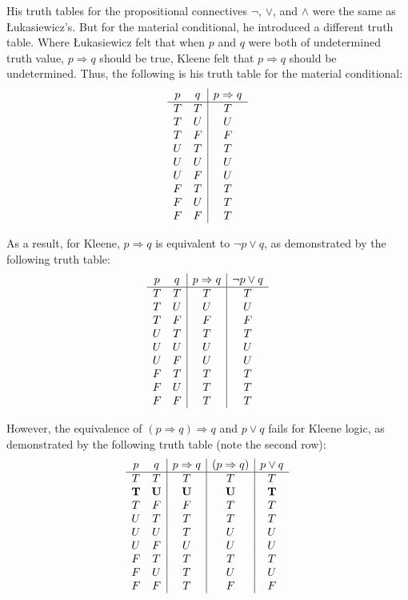 \documentclass[11pt]{article}
\theoremstyle{definition}
\theoremstyle{remark}
\begin{document}
His truth tables for the propositional connectives $\neg$, $\vee$, and $\wedge$ were the same as  Łukasiewicz's. But for the material conditional, he introduced a different truth table. Where  Łukasiewicz felt that when $p$ and $q$ were both of undetermined truth value, $p\Rightarrow q$ should be true, Kleene felt that $p\Rightarrow q$ should be undetermined. Thus, the following is his truth table for the material conditional:
\[
\begin{array}{c c|c}
p & q & p \Rightarrow q \\
\hline
T & T & T \\
T & U & U \\
T & F & F \\
U & T & T \\
U & U & U \\
U & F & U \\
F & T & T \\
F & U & T \\
F & F & T \\
\end{array}
\]\par
\noindent
As a result, for Kleene, $p\Rightarrow q$ is equivalent to $\neg p\vee q$, as demonstrated by the following truth table:
\noindent
\[
\begin{array}{c c|c|c}
p & q & p \Rightarrow q & \neg p \vee q \\
\hline
T & T & T & T\\
T & U & U & U \\
T & F & F & F\\
U & T & T & T\\
U & U & U & U\\
U & F & U & U\\
F & T & T & T\\
F & U & T & T\\
F & F & T & T \\
\end{array}
\]\par
\noindent
However, the equivalence of $(p\Rightarrow q)\Rightarrow q$ and $p\vee q$ fails for Kleene logic, as demonstrated by the following truth table (note the second row):
\noindent
\[
\begin{array}{c c|c|c|c}
p & q & p \Rightarrow q & (p \Rightarrow q) & p \lor q \\
\hline
T & T & T & T & T \\
\textbf{T} & \textbf{U} & \textbf{U} & \textbf{U} & \textbf{T} \\
T & F & F & T & T \\
U & T & T & T & T \\
U & U & T & U & U \\
U & F & U & U & U \\
F & T & T & T & T \\
F & U & T & U & U \\
F & F & T & F & F \\
\end{array}
\]\par
\end{document}
